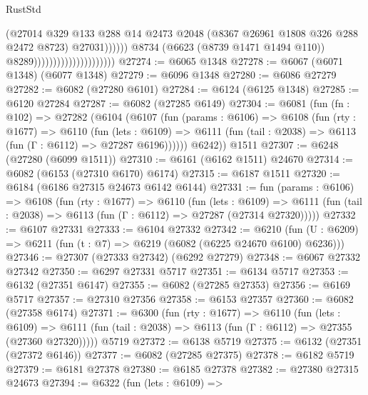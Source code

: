 \begin{lexlean}{RustStd}
\begin{coremodule}
                                                        (@27014
                                                          @329
                                                          @133
                                                          @288
                                                          @14
                                                          @2473
                                                          @2048
                                                          (@8367 @26961 @1808 @326 @288 @2472 @8723)
                                                          @27031))))))
                                              @8734
                                              (@6623 (@8739 @1471 @1494 @110))
                                              @8289)))))))))))))))))))))
@27274 := @6065 @1348
@27278 := @6067 (@6071 @1348) (@6077 @1348)
@27279 := @6096 @1348
@27280 := @6086 @27279
@27282 := @6082 (@27280 @6101)
@27284 := @6124 (@6125 @1348)
@27285 := @6120 @27284
@27287 := @6082 (@27285 @6149)
@27304 := @6081
    (fun (fn : @102) =>
    @27282
      (@6104
        (@6107
          (fun (params : @6106) =>
          @6108
            (fun (rty : @1677) =>
            @6110
              (fun (lets : @6109) =>
              @6111 (fun (tail : @2038) => @6113 (fun (Γ : @6112) => @27287 @6196))))))
        @6242))
    @1511
@27307 := @6248 (@27280 (@6099 @1511))
@27310 := @6161 (@6162 @1511) @24670
@27314 := @6082 (@6153 (@27310 @6170) @6174)
@27315 := @6187 @1511
@27320 := @6184 (@6186 @27315 @24673 @6142 @6144)
@27331 := fun (params : @6106) =>
  @6108
    (fun (rty : @1677) =>
    @6110
      (fun (lets : @6109) =>
      @6111 (fun (tail : @2038) => @6113 (fun (Γ : @6112) => @27287 (@27314 @27320)))))
@27332 := @6107 @27331
@27333 := @6104 @27332
@27342 := @6210
    (fun (U : @6209) => @6211 (fun (t : @7) => @6219 (@6082 (@6225 @24670 @6100) @6236)))
@27346 := @27307 (@27333 @27342) (@6292 @27279)
@27348 := @6067 @27332 @27342
@27350 := @6297 @27331 @5717
@27351 := @6134 @5717
@27353 := @6132 (@27351 @6147)
@27355 := @6082 (@27285 @27353)
@27356 := @6169 @5717
@27357 := @27310 @27356
@27358 := @6153 @27357
@27360 := @6082 (@27358 @6174)
@27371 := @6300
    (fun (rty : @1677) =>
    @6110
      (fun (lets : @6109) =>
      @6111 (fun (tail : @2038) => @6113 (fun (Γ : @6112) => @27355 (@27360 @27320)))))
    @5719
@27372 := @6138 @5719
@27375 := @6132 (@27351 (@27372 @6146))
@27377 := @6082 (@27285 @27375)
@27378 := @6182 @5719
@27379 := @6181 @27378
@27380 := @6185 @27378
@27382 := @27380 @27315 @24673
@27394 := @6322
    (fun (lets : @6109) =>

\end{coremodule}
\end{lexlean}
